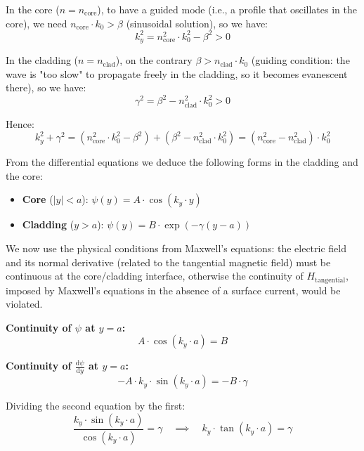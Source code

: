 \documentclass[a4paper,11pt]{report}
\begin{document}
In the core ($n = n_{\text{core}}$), to have a guided mode (i.e., a profile that oscillates in the core), we need $n_{\text{core}} \cdot k_0 > \beta$ (sinusoidal solution), so we have:
\begin{equation}
k_y^2 = n_{\text{core}}^2 \cdot k_0^2 - \beta^2 > 0
\end{equation}

In the cladding ($n = n_{\text{clad}}$), on the contrary $\beta > n_{\text{clad}} \cdot k_0$ (guiding condition: the wave is "too slow" to propagate freely in the cladding, so it becomes evanescent there), so we have:
\begin{equation}
\gamma^2 = \beta^2 - n_{\text{clad}}^2 \cdot k_0^2 > 0
\end{equation}

Hence:
\begin{equation}
k_y^2 + \gamma^2 = (n_{\text{core}}^2 \cdot k_0^2 - \beta^2) + (\beta^2 - n_{\text{clad}}^2 \cdot k_0^2) = (n_{\text{core}}^2 - n_{\text{clad}}^2) \cdot k_0^2
\end{equation}

From the differential equations we deduce the following forms in the cladding and the core:
\begin{itemize}
    \item \textbf{Core} ($|y| < a$): $\psi(y) = A \cdot \cos(k_y \cdot y)$
    \item \textbf{Cladding} ($y > a$): $\psi(y) = B \cdot \exp(-\gamma (y-a))$
\end{itemize}

We now use the physical conditions from Maxwell's equations: the electric field and its normal derivative (related to the tangential magnetic field) must be continuous at the core/cladding interface, otherwise the continuity of $H_{\text{tangential}}$, imposed by Maxwell's equations in the absence of a surface current, would be violated.

\vspace{0.5em}
\noindent \textbf{Continuity of $\psi$ at $y=a$:}
\begin{equation}
A \cdot \cos(k_y \cdot a) = B
\end{equation}

\noindent \textbf{Continuity of $\frac{\text{d}\psi}{\text{d}y}$ at $y=a$:}
\begin{equation}
-A \cdot k_y \cdot \sin(k_y \cdot a) = -B \cdot \gamma
\end{equation}

Dividing the second equation by the first:
\begin{equation}
\frac{k_y \cdot \sin(k_y \cdot a)}{\cos(k_y \cdot a)} = \gamma \quad \implies \quad k_y \cdot \tan(k_y \cdot a) = \gamma
\label{eq:transcendante_ch1}
\end{equation}
\end{document}
